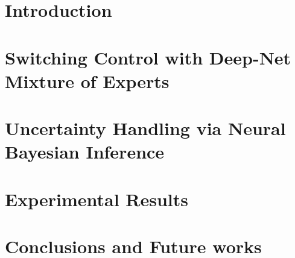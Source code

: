 \documentclass[12pt]{report}
\begin{document}

\begintext


\chapter{Introduction}

\chapter{Switching Control with Deep-Net Mixture of Experts}




\chapter{Uncertainty Handling via Neural Bayesian Inference}




\chapter{Experimental Results}


\chapter{Conclusions and Future works}

{} 



{}
\appendix

\end{document}
